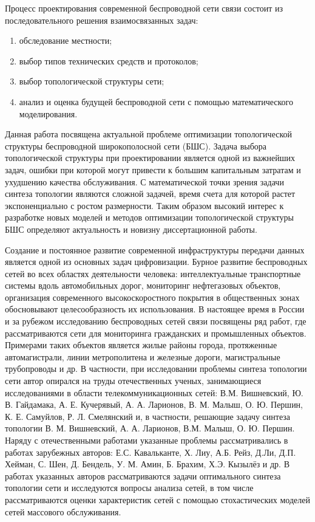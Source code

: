 Процесс проектирования современной  беспроводной сети связи состоит из последовательного решения взаимосвязанных задач:

\begin{enumerate}
    \item обследование местности;
    \item выбор типов технических средств и протоколов;
    \item выбор топологической структуры сети;
    \item анализ и оценка будущей беспроводной сети с помощью математического моделирования.
\end{enumerate}

Данная работа посвящена актуальной проблеме оптимизации топологической структуры беспроводной широкополосной сети (БШС). Задача выбора топологической структуры при проектировании является одной из важнейших задач, ошибки при которой могут привести к большим капитальным затратам и ухудшению качества обслуживания. С математической точки зрения задачи синтеза топологии являются сложной задачей, время счета для которой растет экспоненциально с ростом размерности. Таким образом высокий интерес к разработке новых моделей и методов оптимизации топологической структуры БШС определяют актуальность и новизну диссертационной работы.




{\progress} Создание и постоянное развитие современной инфраструктуры передачи данных является одной из основных задач цифровизации. Бурное развитие беспроводных сетей во всех областях деятельности человека: интеллектуальные транспортные системы вдоль автомобильных дорог, мониторинг нефтегазовых объектов, организация современного высокоскоростного покрытия в общественных зонах обосновывают целесообразность их использования. В настоящее время в России и за рубежом исследованию беспроводных сетей связи посвящены ряд работ, где рассматриваются сети для мониторинга гражданских  и промышленных объектов. Примерами таких объектов является жилые районы города, протяженные автомагистрали, линии метрополитена и железные дороги, магистральные трубопроводы и др. В частности, при исследовании проблемы синтеза топологии сети автор опирался на труды отечественных ученых, занимающиеся исследованиями в области телекоммуникационных сетей: В.М. Вишневский, Ю. В. Гайдамака, А. Е. Кучерявый, А. А. Ларионов, В. М. Малыш,  О. Ю. Першин, К. Е. Самуйлов, Р. Л. Смелянский и, в частности, решающие задачу синтеза топологии В. М. Вишневский, А. А. Ларионов, В.М. Малыш, О. Ю. Першин.
Наряду с отечественными работами указанные проблемы рассматривались в работах зарубежных авторов: Е.С. Кавальканте, Х. Лиу, А.Б. Рейз, Д.Ли, Д.П. Хейман, С. Шен, Д. Бендель, У. М. Амин, Б. Брахим, Х.Э. Кызылёз и др. В работах указанных авторов рассматриваются задачи оптимального синтеза топологии сети и исследуются вопросы анализа сетей, в том числе рассматриваются оценки характеристик сетей с помощью стохастических моделей сетей массового обслуживания. 

